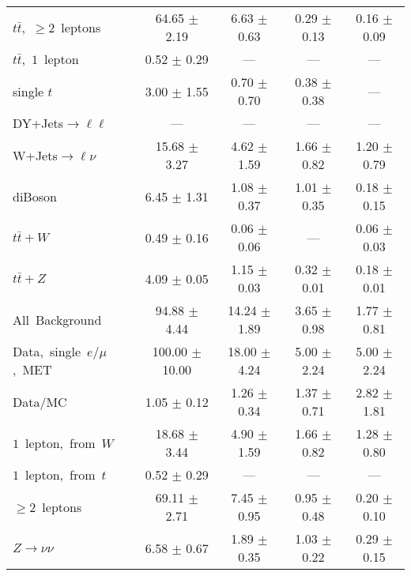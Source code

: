 \documentclass{article}
\begin{document}
\begin{longtable}{|l|c|c|c|c|}
$t\bar{t}$,~$\ge2$~leptons & 64.65 $\pm$ 2.19  & 6.63 $\pm$ 0.63  & 0.29 $\pm$ 0.13  & 0.16 $\pm$ 0.09 \\* 
$t\bar{t}$,~$1$~lepton & 0.52 $\pm$ 0.29  & ---  & ---  & --- \\* 
single $t$  & 3.00 $\pm$ 1.55  & 0.70 $\pm$ 0.70  & 0.38 $\pm$ 0.38  & --- \\* 
DY+Jets$\rightarrow\ell\ell$  & ---  & ---  & ---  & --- \\* 
W+Jets$\rightarrow\ell\nu$  & 15.68 $\pm$ 3.27  & 4.62 $\pm$ 1.59  & 1.66 $\pm$ 0.82  & 1.20 $\pm$ 0.79 \\* 
diBoson  & 6.45 $\pm$ 1.31  & 1.08 $\pm$ 0.37  & 1.01 $\pm$ 0.35  & 0.18 $\pm$ 0.15 \\* 
$t\bar{t}+W$  & 0.49 $\pm$ 0.16  & 0.06 $\pm$ 0.06  & ---  & 0.06 $\pm$ 0.03 \\* 
$t\bar{t}+Z$  & 4.09 $\pm$ 0.05  & 1.15 $\pm$ 0.03  & 0.32 $\pm$ 0.01  & 0.18 $\pm$ 0.01 \\* 
\hline \hline 
All~Background  & 94.88 $\pm$ 4.44  & 14.24 $\pm$ 1.89  & 3.65 $\pm$ 0.98  & 1.77 $\pm$ 0.81 \\* 
Data,~single~$e/\mu$,~MET  & 100.00 $\pm$ 10.00  & 18.00 $\pm$ 4.24  & 5.00 $\pm$ 2.24  & 5.00 $\pm$ 2.24 \\* 
Data/MC  & 1.05 $\pm$ 0.12  & 1.26 $\pm$ 0.34  & 1.37 $\pm$ 0.71  & 2.82 $\pm$ 1.81 \\* 
\hline \hline 
$1$~lepton,~from~$W$  & 18.68 $\pm$ 3.44  & 4.90 $\pm$ 1.59  & 1.66 $\pm$ 0.82  & 1.28 $\pm$ 0.80 \\* 
$1$~lepton,~from~$t$  & 0.52 $\pm$ 0.29  & ---  & ---  & --- \\* 
$\ge2$~leptons  & 69.11 $\pm$ 2.71  & 7.45 $\pm$ 0.95  & 0.95 $\pm$ 0.48  & 0.20 $\pm$ 0.10 \\* 
$Z\rightarrow\nu\nu$  & 6.58 $\pm$ 0.67  & 1.89 $\pm$ 0.35  & 1.03 $\pm$ 0.22  & 0.29 $\pm$ 0.15 \\* 
\hline 
\end{longtable} 

 
 
 
 
\pagebreak 

 
 
 
 
\end{document}
